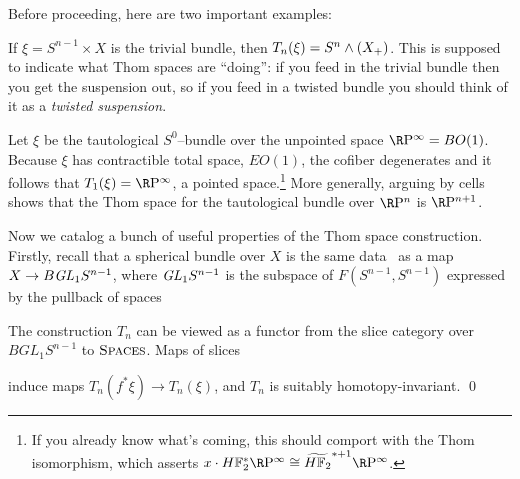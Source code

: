 Before proceeding, here are two important examples:
\begin{example}\label{TrivialBundleThomExample}
If \(\xi = S^{n-1} \times X\) is the trivial bundle, then \(T_n(\xi) = S^n \wedge (X_+)\).  This is supposed to indicate what Thom spaces are ``doing'': if you feed in the trivial bundle then you get the suspension out, so if you feed in a twisted bundle you should think of it as a \textit{twisted suspension}.
\end{example}

\begin{example}\label{RPnThomExample}
Let \(\xi\) be the tautological \(S^0\)--bundle over the unpointed space \(\RP^\infty = BO(1)\).  Because \(\xi\) has contractible total space, \(EO(1)\), the cofiber degenerates and it follows that \(T_1(\xi) = \RP^\infty\), a pointed space.\footnote{If you already know what's coming, this should comport with the Thom isomorphism, which asserts \(x \cdot \HFtwo^* \RP^\infty \cong \widetilde{\HFtwo}^{* + 1} \RP^\infty\).}  More generally, arguing by cells shows that the Thom space for the tautological bundle over \(\RP^n\) is \(\RP^{n+1}\).
\end{example}

Now we catalog a bunch of useful properties of the Thom space construction.  Firstly, recall that a spherical bundle over \(X\) is the same data~\cite{MayClassifyingSpaces} as a map \(X \to B \mathit{GL}_1 S^{n-1}\), where \(\mathit{GL}_1 S^{n-1}\) is the subspace of \(F(S^{n-1}, S^{n-1})\) expressed by the pullback of spaces
\begin{center}
\end{center}

\begin{lemma}\label{ThomConstructionIsASliceFunctor}
The construction \(T_n\) can be viewed as a functor from the slice category over \(BGL_1 S^{n-1}\) to \(\normalfont\textsc{Spaces}\).  Maps of slices
\begin{center}
\end{center}
induce maps \(T_n(f^* \xi) \to T_n(\xi)\), and \(T_n\) is suitably homotopy-invariant. \qed
\end{lemma}

